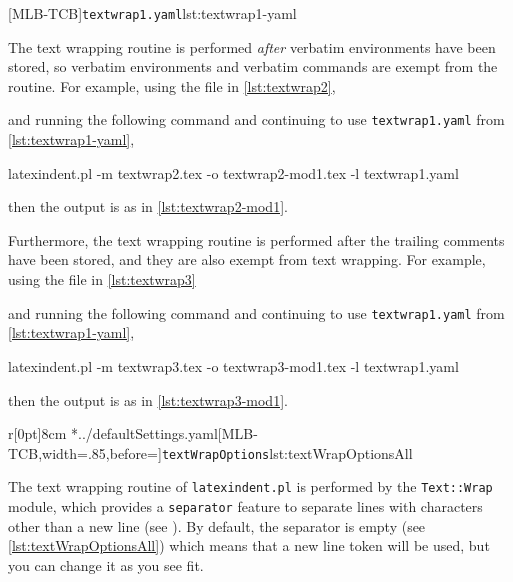 	\begin{minipage}{.45\linewidth}
	\end{minipage}
	\hfill
	\begin{minipage}{.45\linewidth}
		[MLB-TCB]{\texttt{textwrap1.yaml}}{lst:textwrap1-yaml}
	\end{minipage}

	The text wrapping routine is performed \emph{after} verbatim environments have been stored, so verbatim environments and verbatim commands are exempt from the routine.
	For example, using the file in \cref{lst:textwrap2}, \begin{widepage}  \end{widepage} and running the following command and continuing to use \texttt{textwrap1.yaml} from \cref{lst:textwrap1-yaml}, \begin{commandshell}
latexindent.pl -m textwrap2.tex -o textwrap2-mod1.tex -l textwrap1.yaml
\end{commandshell} then the output is as in \cref{lst:textwrap2-mod1}.
	\begin{widepage}
	\end{widepage}
	Furthermore, the text wrapping routine is performed after the trailing comments have been stored, and they are also exempt from text wrapping.
	For example, using the file in \cref{lst:textwrap3} \begin{widepage}  \end{widepage} and running the following command and continuing to use \texttt{textwrap1.yaml} from \cref{lst:textwrap1-yaml}, \begin{commandshell}
latexindent.pl -m textwrap3.tex -o textwrap3-mod1.tex -l textwrap1.yaml
\end{commandshell} then the output is as in \cref{lst:textwrap3-mod1}.


	\begin{wrapfigure}[6]{r}[0pt]{8cm}
		\cmhlistingsfromfile[style=textWrapOptionsAll]*{../defaultSettings.yaml}[MLB-TCB,width=.85\linewidth,before=\centering]{\texttt{textWrapOptions}}{lst:textWrapOptionsAll}
	\end{wrapfigure}
	The text wrapping routine of \texttt{latexindent.pl} is performed by the \texttt{Text::Wrap} module, which provides a \texttt{separator} feature to separate lines with characters other than a new line (see \cite{textwrap}).
	By default, the separator is empty (see \cref{lst:textWrapOptionsAll}) which means that a new line token will be used, but you can change it as you see fit.


